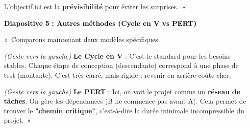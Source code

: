 \documentclass[12pt, a4paper]{article}
\newcommand{\slideheader}[2]{
    \vspace{1cm}
    \noindent
    \colorbox{slideheader!20}{
        \parbox{\dimexpr\linewidth-2\fboxsep\relax}{
            \textbf{\Large \textcolor{black}{Diapositive #1 : #2}}
        }
    }
    \vspace{0.5cm}
}
\begin{document}
L'objectif ici est la \textbf{prévisibilité} pour éviter les surprises.~»

\slideheader{5}{Autres méthodes (Cycle en V vs PERT)}

«~Comparons maintenant deux modèles spécifiques.

\medskip
\textit{(Geste vers la gauche)}
\textbf{Le Cycle en V} : C'est le standard pour les besoins stables. Chaque étape de conception (descendante) correspond à une phase de test (montante). C'est très carré, mais rigide : revenir en arrière coûte cher.

\medskip
\textit{(Geste vers la gauche)}
\textbf{Le PERT} : Ici, on voit le projet comme un \textbf{réseau de tâches}. On gère les dépendances (B ne commence pas avant A). Cela permet de trouver le \textbf{"chemin critique"}, c'est-à-dire la durée minimale incompressible du projet.~»
\end{document}
